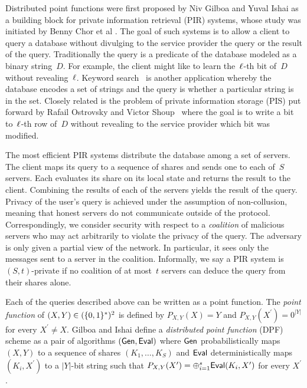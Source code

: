 %
\label{sec:intro}


Distributed point functions were first proposed by Niv Gilboa and Yuval Ishai
\cite{dpf} as a building block for private information retrieval (PIR) systems,
whose study was initiated by Benny Chor et al \cite{pir}. The goal of such
systems is to allow a client to query a database without divulging to the
service provider the query or the result of the query.
%
Traditionally the query is a predicate of the database modeled as a binary
string~$D$. For example, the client might like to learn the~$\ell$-th bit of~$D$
without revealing~$\ell$.
%
Keyword search~\cite{pir-kws} is another application whereby the database
encodes a set of strings and the query is whether a particular string is in the
set.
%
Closely related is the problem of private information storage (PIS) put forward
by Rafail Ostrovsky and Victor Shoup~\cite{pis} where the goal is to write a bit
to~$\ell$-th row of~$D$ without revealing to the service provider which bit was
modified.

The most efficient PIR systems distribute the database among a set of servers.
%
The client maps its query to a sequence of shares and sends one to each
of~$S$ servers. Each evaluates its share on its local state and returns
the result to the client. Combining the results of each of the servers yields
the result of the query.
%
Privacy of the user's query is achieved under the assumption of non-collusion,
meaning that honest servers do not communicate outside of the protocol.
Correspondingly, we consider security with respect to a \emph{coalition} of
malicious servers who may act arbitrarily to violate the privacy of the query.
%
The adversary is only given a partial view of the network. In particular, it
sees only the messages sent to a server in the coalition.
%
Informally, we say a PIR system is $(S,t)$-private if no coalition of at
most~$t$ servers can deduce the query from their shares alone.

Each of the queries described above can be written as a point function.
%
The \emph{point function} of $(X,Y) \in (\{0,1\}^*)^2$ is defined by $P_{X,Y}(X) =
Y$ and $P_{X,Y}(X^\prime) = 0^{|Y|}$ for every $X^\prime \ne X$.
%
Gilboa and Ishai define a \emph{distributed point function} (DPF) scheme as a
pair of algorithms $(\mathsf{Gen}, \mathsf{Eval})$ where $\mathsf{Gen}$ probabilistically maps $(X,Y)$
to a sequence of shares $(K_1, \ldots, K_S)$ and $\mathsf{Eval}$
deterministically maps $(K_i, X^\prime)$ to a $|Y|$-bit string such that
$P_{X,Y}(X^\prime) = \mathbin{\oplus}_{i=1}^s \mathsf{Eval}(K_i, X^\prime)$ for every $X^\prime$.

